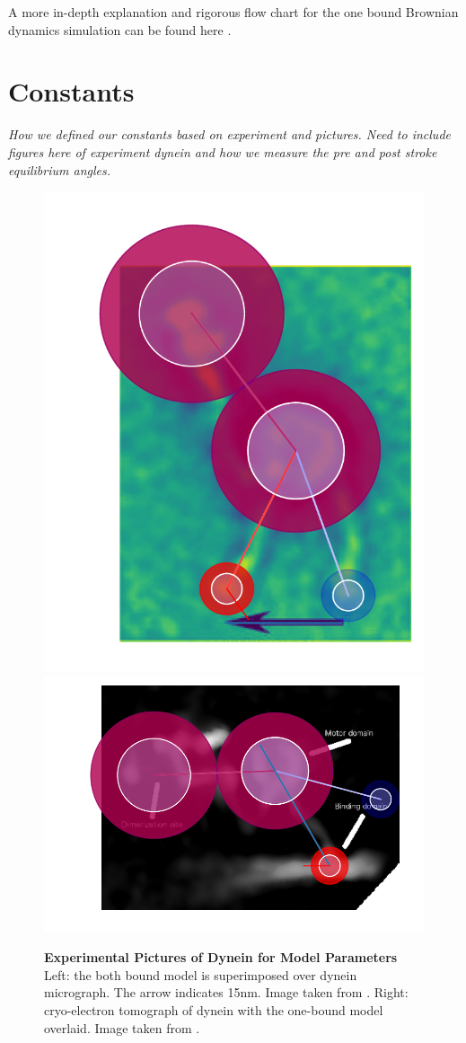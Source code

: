A more in-depth explanation and rigorous flow chart for the one bound Brownian dynamics simulation can be found here \cite{Capek2017, }.


\section{Constants}
\textit{How we defined our constants based on experiment and pictures.  Need to include figures here of experiment dynein and how we measure the pre and post stroke equilibrium angles.}

\begin{figure}[hbt!]
	\centering
	\includegraphics[width=0.3\columnwidth]{../../plots/burgess-model-figure.pdf}
	\includegraphics[width=0.5\columnwidth]{../../plots/grotjahn-model-figure.pdf}%
	\caption[Experimental Pictures of Dynein for Model Parameters]{\textbf{Experimental Pictures of Dynein for Model Parameters} Left: the both bound model is superimposed over dynein micrograph. The arrow indicates 15nm. Image taken from \cite{burgess2003dynein}.  Right: cryo-electron tomograph of dynein with the one-bound model overlaid. Image taken from \cite{grotjahn}.} 
	\label{fig:ModelParams}
\end{figure}


